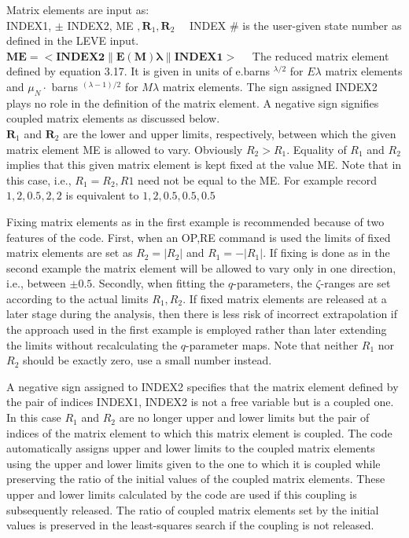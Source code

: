 \documentclass[10pt]{article}
\begin{document}
Matrix elements are input as:\\
INDEX1, $\pm$ INDEX2, ME $, \mathbf{R}_{1}, \mathbf{R}_{2} \quad$ INDEX $\#$ is the user-given state number as defined in the LEVE input.\\
$\mathbf{M E}=<\mathbf{I N D E X 2}\|\mathbf{E}(\mathbf{M}) \boldsymbol{\lambda}\| \mathbf{I N D E X 1}>\quad$ The reduced matrix element defined by equation 3.17. It is given in units of e.barns ${ }^{\lambda / 2}$ for $E \lambda$ matrix elements and $\mu_{N} \cdot$ barns ${ }^{(\lambda-1) / 2}$ for $M \lambda$ matrix elements. The sign assigned INDEX2 plays no role in the definition of the matrix element. A negative sign signifies coupled matrix elements as discussed below.\\
$\mathbf{R}_{1}$ and $\mathbf{R}_{2}$ are the lower and upper limits, respectively, between which the given matrix element ME is allowed to vary. Obviously $R_{2}>R_{1}$. Equality of $R_{1}$ and $R_{2}$ implies that this given matrix element is kept fixed at the value ME. Note that in this case, i.e., $R_{1}=R_{2}, R 1$ need not be equal to the ME. For example record $1,2,0.5,2,2$ is equivalent to $1,2,0.5,0.5,0.5$

Fixing matrix elements as in the first example is recommended because of two features of the code. First, when an OP,RE command is used the limits of fixed matrix elements are set as $R_{2}=\left|R_{2}\right|$ and $R_{1}=-\left|R_{1}\right|$. If fixing is done as in the second example the matrix element will be allowed to vary only in one direction, i.e., between $\pm 0.5$. Secondly, when fitting the $q$-parameters, the $\zeta$-ranges are set according to the actual limits $R_{1}, R_{2}$. If fixed matrix elements are released at a later stage during the analysis, then there is less risk of incorrect extrapolation if the approach used in the first example is employed rather than later extending the limits without recalculating the $q$-parameter maps. Note that neither $R_{1}$ nor $R_{2}$ should be exactly zero, use a small number instead.

A negative sign assigned to INDEX2 specifies that the matrix element defined by the pair of indices INDEX1, INDEX2 is not a free variable but is a coupled one. In this case $R_{1}$ and $R_{2}$ are no longer upper and lower limits but the pair of indices of the matrix element to which this matrix element is coupled. The code automatically assigns upper and lower limits to the coupled matrix elements using the upper and lower limits given to the one to which it is coupled while preserving the ratio of the initial values of the coupled matrix elements. These upper and lower limits calculated by the code are used if this coupling is subsequently released. The ratio of coupled matrix elements set by the initial values is preserved in the least-squares search if the coupling is not released.
\end{document}
